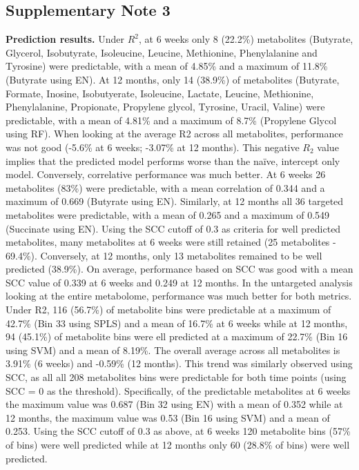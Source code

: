 \subsection{Supplementary Note 3} \label{appB_note3}
\textbf{Prediction results.} Under $R^2$, at 6 weeks only 8 (22.2\%) metabolites (Butyrate, Glycerol, Isobutyrate, Isoleucine, Leucine, Methionine, Phenylalanine and Tyrosine) were predictable, with a mean of 4.85\% and a maximum of 11.8\% (Butyrate using EN). At 12 months, only 14 (38.9\%) of metabolites (Butyrate, Formate, Inosine, Isobutyerate, Isoleucine, Lactate, Leucine, Methionine, Phenylalanine, Propionate, Propylene glycol, Tyrosine, Uracil, Valine) were predictable, with a mean of 4.81\% and a maximum of 8.7\% (Propylene Glycol using RF). When looking at the average R2 across all metabolites, performance was not good (-5.6\% at 6 weeks; -3.07\% at 12 months). This negative $R_2$ value implies that the predicted model performs worse than the naïve, intercept only model. Conversely, correlative performance was much better. At 6 weeks 26 metabolites (83\%) were predictable, with a mean correlation of 0.344 and a maximum of 0.669 (Butyrate using EN). Similarly, at 12 months all 36 targeted metabolites were predictable, with a mean of 0.265 and a maximum of 0.549 (Succinate using EN). Using the SCC cutoff of 0.3 as criteria for well predicted metabolites, many metabolites at 6 weeks were still retained (25 metabolites - 69.4\%). Conversely, at 12 months, only 13 metabolites remained to be well predicted (38.9\%). On average, performance based on SCC was good with a mean SCC value of 0.339 at 6 weeks and 0.249 at 12 months. In the untargeted analysis looking at the entire metabolome, performance was much better for both metrics. Under R2, 116 (56.7\%) of metabolite bins were predictable at a maximum of 42.7\% (Bin 33 using SPLS) and a mean of 16.7\% at 6 weeks while at 12 months, 94 (45.1\%) of metabolite bins were ell predicted at a maximum of 22.7\% (Bin 16 using SVM) and a mean of 8.19\%. The overall average across all metabolites is 3.91\% (6 weeks) and -0.59\% (12 months). This trend was similarly observed using SCC, as all all 208 metabolites bins were predictable for both time points (using SCC = 0 as the threshold). Specifically, of the predictable metabolites at 6 weeks the maximum value was 0.687 (Bin 32 using EN) with a mean of 0.352 while at 12 months, the maximum value was 0.53 (Bin 16 using SVM) and a mean of 0.253. Using the SCC cutoff of 0.3 as above, at 6 weeks 120 metabolite bins (57\% of bins) were well predicted while at 12 months only 60 (28.8\% of bins) were well predicted.

